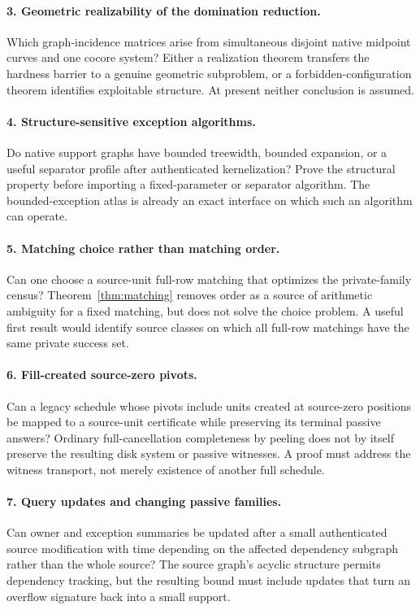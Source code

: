\documentclass[11pt,letterpaper]{article}
\theoremstyle{definition}
\begin{document}
\paragraph{3. Geometric realizability of the domination reduction.}
Which graph-incidence matrices arise from simultaneous disjoint native midpoint curves and one cocore system? Either a realization theorem transfers the hardness barrier to a genuine geometric subproblem, or a forbidden-configuration theorem identifies exploitable structure. At present neither conclusion is assumed.

\paragraph{4. Structure-sensitive exception algorithms.}
Do native support graphs have bounded treewidth, bounded expansion, or a useful separator profile after authenticated kernelization? Prove the structural property before importing a fixed-parameter or separator algorithm. The bounded-exception atlas is already an exact interface on which such an algorithm can operate.

\paragraph{5. Matching choice rather than matching order.}
Can one choose a source-unit full-row matching that optimizes the private-family census? Theorem~\ref{thm:matching} removes order as a source of arithmetic ambiguity for a fixed matching, but does not solve the choice problem. A useful first result would identify source classes on which all full-row matchings have the same private success set.

\paragraph{6. Fill-created source-zero pivots.}
Can a legacy schedule whose pivots include units created at source-zero positions be mapped to a source-unit certificate while preserving its terminal passive answers? Ordinary full-cancellation completeness by peeling does not by itself preserve the resulting disk system or passive witnesses. A proof must address the witness transport, not merely existence of another full schedule.

\paragraph{7. Query updates and changing passive families.}
Can owner and exception summaries be updated after a small authenticated source modification with time depending on the affected dependency subgraph rather than the whole source? The source graph's acyclic structure permits dependency tracking, but the resulting bound must include updates that turn an overflow signature back into a small support.
\end{document}

